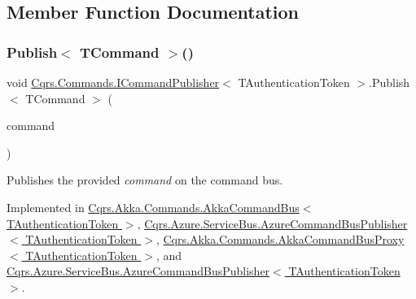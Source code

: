 \subsection{Member Function Documentation}
\mbox{\label{interfaceCqrs_1_1Commands_1_1ICommandPublisher_aeeb487ad5686d9c44d214b1daaf7833a_aeeb487ad5686d9c44d214b1daaf7833a}} 
\subsubsection{\texorpdfstring{Publish$<$ T\+Command $>$()}{Publish< TCommand >()}\hspace{0.1cm}{\footnotesize\ttfamily [1/2]}}
{\footnotesize\ttfamily void \hyperlink{interfaceCqrs_1_1Commands_1_1ICommandPublisher}{Cqrs.\+Commands.\+I\+Command\+Publisher}$<$ T\+Authentication\+Token $>$.Publish$<$ T\+Command $>$ (\begin{DoxyParamCaption}\item[{T\+Command}]{command }\end{DoxyParamCaption})}



Publishes the provided {\itshape command}  on the command bus. 



Implemented in \hyperlink{classCqrs_1_1Akka_1_1Commands_1_1AkkaCommandBus_a48e1d46035b1e1a3251636b8a03f7dae_a48e1d46035b1e1a3251636b8a03f7dae}{Cqrs.\+Akka.\+Commands.\+Akka\+Command\+Bus$<$ T\+Authentication\+Token $>$}, \hyperlink{classCqrs_1_1Azure_1_1ServiceBus_1_1AzureCommandBusPublisher_aefdaed600f88cc645a1b7ab41db42a69_aefdaed600f88cc645a1b7ab41db42a69}{Cqrs.\+Azure.\+Service\+Bus.\+Azure\+Command\+Bus\+Publisher$<$ T\+Authentication\+Token $>$}, \hyperlink{classCqrs_1_1Akka_1_1Commands_1_1AkkaCommandBusProxy_a410c0fe52016d04de950b1ae767d2ccb_a410c0fe52016d04de950b1ae767d2ccb}{Cqrs.\+Akka.\+Commands.\+Akka\+Command\+Bus\+Proxy$<$ T\+Authentication\+Token $>$}, and \hyperlink{classCqrs_1_1Azure_1_1ServiceBus_1_1AzureCommandBusPublisher_aefdaed600f88cc645a1b7ab41db42a69_aefdaed600f88cc645a1b7ab41db42a69}{Cqrs.\+Azure.\+Service\+Bus.\+Azure\+Command\+Bus\+Publisher$<$ T\+Authentication\+Token $>$}.

